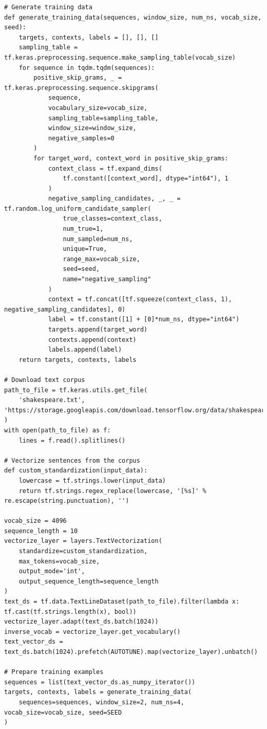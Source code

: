 \begin{lstlisting}
# Generate training data
def generate_training_data(sequences, window_size, num_ns, vocab_size, seed):
    targets, contexts, labels = [], [], []
    sampling_table = tf.keras.preprocessing.sequence.make_sampling_table(vocab_size)
    for sequence in tqdm.tqdm(sequences):
        positive_skip_grams, _ = tf.keras.preprocessing.sequence.skipgrams(
            sequence,
            vocabulary_size=vocab_size,
            sampling_table=sampling_table,
            window_size=window_size,
            negative_samples=0
        )
        for target_word, context_word in positive_skip_grams:
            context_class = tf.expand_dims(
                tf.constant([context_word], dtype="int64"), 1
            )
            negative_sampling_candidates, _, _ = tf.random.log_uniform_candidate_sampler(
                true_classes=context_class,
                num_true=1,
                num_sampled=num_ns,
                unique=True,
                range_max=vocab_size,
                seed=seed,
                name="negative_sampling"
            )
            context = tf.concat([tf.squeeze(context_class, 1), negative_sampling_candidates], 0)
            label = tf.constant([1] + [0]*num_ns, dtype="int64")
            targets.append(target_word)
            contexts.append(context)
            labels.append(label)
    return targets, contexts, labels

# Download text corpus
path_to_file = tf.keras.utils.get_file(
    'shakespeare.txt', 'https://storage.googleapis.com/download.tensorflow.org/data/shakespeare.txt'
)
with open(path_to_file) as f:
    lines = f.read().splitlines()

# Vectorize sentences from the corpus
def custom_standardization(input_data):
    lowercase = tf.strings.lower(input_data)
    return tf.strings.regex_replace(lowercase, '[%s]' % re.escape(string.punctuation), '')

vocab_size = 4096
sequence_length = 10
vectorize_layer = layers.TextVectorization(
    standardize=custom_standardization,
    max_tokens=vocab_size,
    output_mode='int',
    output_sequence_length=sequence_length
)
text_ds = tf.data.TextLineDataset(path_to_file).filter(lambda x: tf.cast(tf.strings.length(x), bool))
vectorize_layer.adapt(text_ds.batch(1024))
inverse_vocab = vectorize_layer.get_vocabulary()
text_vector_ds = text_ds.batch(1024).prefetch(AUTOTUNE).map(vectorize_layer).unbatch()

# Prepare training examples
sequences = list(text_vector_ds.as_numpy_iterator())
targets, contexts, labels = generate_training_data(
    sequences=sequences, window_size=2, num_ns=4, vocab_size=vocab_size, seed=SEED
)


\end{lstlisting}
